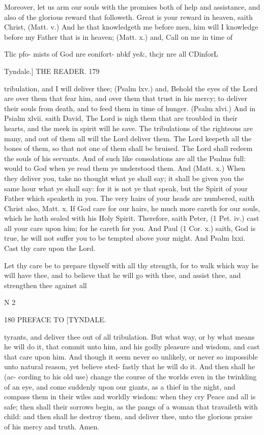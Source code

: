 \documentclass{custom}
\begin{document}
Moreover, let us arm our souls with the 
promises both of help and assistance, and also of 
the glorious reward that followeth. Great is 
your reward in heaven, saith Christ, (Matt. v.) 
And he that knowledgeth me before men, him
will I knowledge before my Father that is in 
heaven; (Matt. x.) and, Call on me in time of



Tlic pfo- 
mists of 
God nre 
eonifort- 
nbkf ye&, 
thcjr nre all 
CDinforL 


Tyndale.] 
THE READER. 
179

tribulation, and I will deliver thee; (Psalm lxv.)
and, Behold the eyes of the Lord are over them 
that fear him, and over them that trust in his 
mercy; to deliver their souls from death, and to 
feed them in time of hunger. (Psalm xlvi.) And 
in Psialm xlvii. saith David, The Lord is nigh 
them that are troubled in their hearts, and the 
meek in spirit will he save. The tribulations of 
the righteous are many, and out of them all will 
the Lord deliver them. The Lord keepeth all 
the bones of them, so that not one of them shall be 
bruised. The Lord shall redeem the souls of 
his servants. And of such like consolations are 
all the Psalms full: would to God when ye read 
them ye understood them. And (Matt. x.) When 
they deliver you, take no thought what ye shall 
say; it shall be given you the same hour what ye 
shall say: for it is not ye that speak, but the 
Spirit of your Father which speaketh in you. The 
very hairs of your heads are numbered, saith 
Christ also, Matt. x. If God care for our hairs, 
he much more careth for our souls, which he hath 
sealed with his Holy Spirit. Therefore, saith 
Peter, (1 Pet. iv.) cast all your care upon him;
for he careth for you. And Paul (1 Cor. x.)
saith, God is true, he will not suffer you to be
tempted above your might. And Psalm lxxi.
Cast thy care upon the Lord. 

Let thy care be to prepare thyself with all thy
strength, for to walk which way he will have
thee, and to believe that he will go with thee, 
and assist thee, and strengthen thee against all 

N 2 


180
PREFACE TO 
[TYNDALE.

tyrants, and deliver thee out of all tribulation. 
But what way, or by what means he will do 
it, that commit unto him, and his godly pleasure 
and wisdom, and cast that care upon him. And 
though it seem never so unlikely, or never so 
impossible unto natural reason, yet believe sted- 
fastly that he will do it. And then shall he (ac- 
cording to his old use) change the course of the 
worlds even in the twinkling of an eye, and come 
suddenly upon our giants, as a thief in the 
night, and compass them in their wiles and 
worldly wisdom: when they cry Peace and all is 
safe; then shall their sorrows begin, as the 
pangs of a woman that travaileth with child:
and then shall he destroy them, and deliver thee, 
unto the glorious praise of his mercy and truth. 
Amen. 
\end{document}
